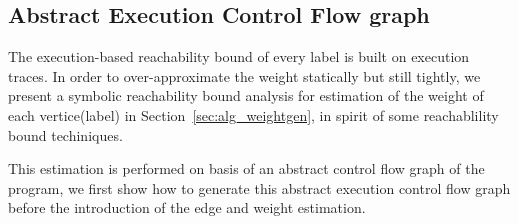   

\subsection{Abstract Execution Control Flow graph}
\label{sec:abscfg}
The execution-based reachability bound of every label
is built on  execution traces.
In order to over-approximate the weight statically but still tightly, we present a symbolic reachability bound analysis for estimation of the weight of each vertice(label) in Section~\ref{sec:alg_weightgen},
in spirit of some reachablility bound techiniques.

This estimation is performed on basis of an abstract control flow graph of the program, we first show how to generate this abstract execution control flow graph before the introduction of  the edge and weight estimation.  

